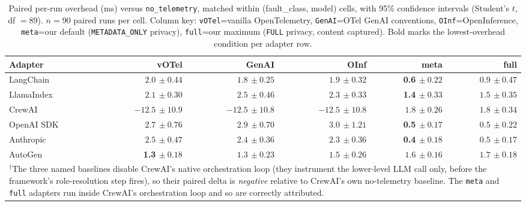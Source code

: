 \documentclass[sigconf,review,anonymous,9pt]{acmart}
\begin{document}
\begin{table}[t]
\centering
\small
\caption{Paired per-run overhead (ms) versus \texttt{no\_telemetry},
matched within (fault\_class, model) cells, with 95\% confidence
intervals (Student's $t$, df $= 89$). $n = 90$ paired runs per cell.
Column key: \texttt{vOTel}=vanilla OpenTelemetry,
\texttt{GenAI}=OTel GenAI conventions, \texttt{OInf}=OpenInference,
\texttt{meta}=our default (\texttt{METADATA\_ONLY} privacy),
\texttt{full}=our maximum (\texttt{FULL} privacy, content captured).
Bold marks the lowest-overhead condition per adapter row.}
\label{tab:e2e_ci}
\begin{tabular}{@{}lrrrrr@{}}
\toprule
\textbf{Adapter} & \textbf{vOTel} & \textbf{GenAI} & \textbf{OInf} & \textbf{meta} & \textbf{full} \\
\midrule
LangChain
& $2.0{\scriptstyle\,\pm 0.44}$
& $1.8{\scriptstyle\,\pm 0.25}$
& $1.9{\scriptstyle\,\pm 0.32}$
& \textbf{0.6}${\scriptstyle\,\pm 0.22}$
& $0.9{\scriptstyle\,\pm 0.47}$ \\
LlamaIndex
& $2.1{\scriptstyle\,\pm 0.30}$
& $2.5{\scriptstyle\,\pm 0.46}$
& $2.3{\scriptstyle\,\pm 0.33}$
& \textbf{1.4}${\scriptstyle\,\pm 0.33}$
& $1.5{\scriptstyle\,\pm 0.35}$ \\
CrewAI
& $-12.5{\scriptstyle\,\pm 10.9}$\rlap{$^{\dagger}$}
& $-12.5{\scriptstyle\,\pm 10.8}$\rlap{$^{\dagger}$}
& $-12.5{\scriptstyle\,\pm 10.8}$\rlap{$^{\dagger}$}
& $1.8{\scriptstyle\,\pm 0.26}$
& $1.8{\scriptstyle\,\pm 0.34}$ \\
OpenAI SDK
& $2.7{\scriptstyle\,\pm 0.76}$
& $2.9{\scriptstyle\,\pm 0.70}$
& $3.0{\scriptstyle\,\pm 1.21}$
& \textbf{0.5}${\scriptstyle\,\pm 0.17}$
& $0.5{\scriptstyle\,\pm 0.22}$ \\
Anthropic
& $2.5{\scriptstyle\,\pm 0.47}$
& $2.4{\scriptstyle\,\pm 0.36}$
& $2.3{\scriptstyle\,\pm 0.36}$
& \textbf{0.4}${\scriptstyle\,\pm 0.18}$
& $0.5{\scriptstyle\,\pm 0.17}$ \\
AutoGen
& \textbf{1.3}${\scriptstyle\,\pm 0.18}$
& $1.3{\scriptstyle\,\pm 0.23}$
& $1.5{\scriptstyle\,\pm 0.26}$
& $1.6{\scriptstyle\,\pm 0.16}$
& $1.7{\scriptstyle\,\pm 0.18}$ \\
\bottomrule
\multicolumn{6}{p{0.95\linewidth}}{\footnotesize $^{\dagger}$The
three named baselines disable CrewAI's native orchestration loop
(they instrument the lower-level LLM call only, before the
framework's role-resolution step fires), so their paired delta is
\emph{negative} relative to CrewAI's own no-telemetry baseline. The
\texttt{meta} and \texttt{full} adapters run inside CrewAI's
orchestration loop and so are correctly attributed.}
\end{tabular}
\end{table}
\end{document}
